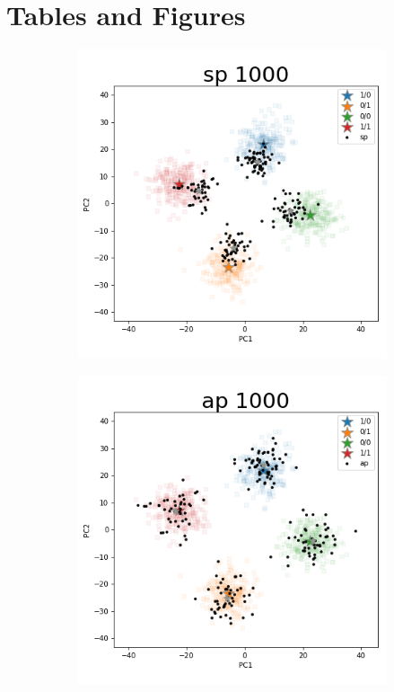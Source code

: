 \documentclass{article}
\begin{document}
\newpage

\appendix



\newpage
\section{Tables and Figures}

\begin{figure}[p]
\begin{subfigure}{.5\textwidth}
  \centering
  \includegraphics[width=.98\linewidth]{img/ggsim1000_100000_200_2_1_100_1_sturef_ggsim1000_100000_1000_2_1_100_0_sp}
\end{subfigure}%
\begin{subfigure}{.5\textwidth}
  \centering
  \includegraphics[width=.98\linewidth]{img/ggsim1000_100000_200_2_1_100_1_sturef_ggsim1000_100000_1000_2_1_100_0_ap}

\end{subfigure}
\end{figure}
\end{document}
